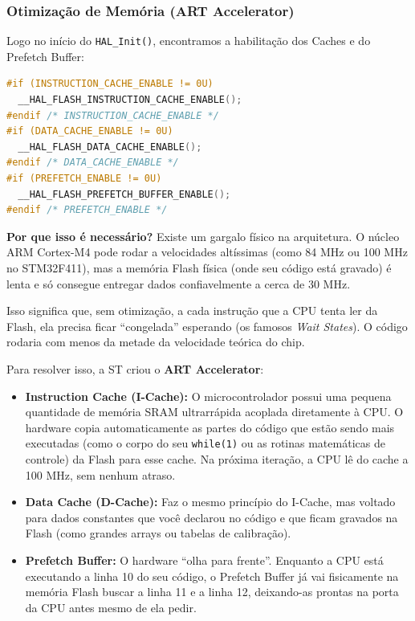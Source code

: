 \documentclass[12pt,a4paper]{article}
\begin{document}
\subsubsection{Otimização de Memória (ART Accelerator)}

Logo no início do \texttt{HAL\_Init()}, encontramos a habilitação dos Caches e do Prefetch Buffer:

\begin{lstlisting}[language=C]
#if (INSTRUCTION_CACHE_ENABLE != 0U)
  __HAL_FLASH_INSTRUCTION_CACHE_ENABLE();
#endif /* INSTRUCTION_CACHE_ENABLE */
#if (DATA_CACHE_ENABLE != 0U)
  __HAL_FLASH_DATA_CACHE_ENABLE();
#endif /* DATA_CACHE_ENABLE */
#if (PREFETCH_ENABLE != 0U)
  __HAL_FLASH_PREFETCH_BUFFER_ENABLE();
#endif /* PREFETCH_ENABLE */
\end{lstlisting}

\textbf{Por que isso é necessário?}
Existe um gargalo físico na arquitetura. O núcleo ARM Cortex-M4 pode rodar a velocidades altíssimas (como 84 MHz ou 100 MHz no STM32F411), mas a memória Flash física (onde seu código está gravado) é lenta e só consegue entregar dados confiavelmente a cerca de 30 MHz.

Isso significa que, sem otimização, a cada instrução que a CPU tenta ler da Flash, ela precisa ficar ``congelada'' esperando (os famosos \textit{Wait States}). O código rodaria com menos da metade da velocidade teórica do chip.

Para resolver isso, a ST criou o \textbf{ART Accelerator}:
\begin{itemize}
    \item \textbf{Instruction Cache (I-Cache):} O microcontrolador possui uma pequena quantidade de memória SRAM ultrarrápida acoplada diretamente à CPU. O hardware copia automaticamente as partes do código que estão sendo mais executadas (como o corpo do seu \texttt{while(1)} ou as rotinas matemáticas de controle) da Flash para esse cache. Na próxima iteração, a CPU lê do cache a 100 MHz, sem nenhum atraso.
    \item \textbf{Data Cache (D-Cache):} Faz o mesmo princípio do I-Cache, mas voltado para dados constantes que você declarou no código e que ficam gravados na Flash (como grandes arrays ou tabelas de calibração).
    \item \textbf{Prefetch Buffer:} O hardware ``olha para frente''. Enquanto a CPU está executando a linha 10 do seu código, o Prefetch Buffer já vai fisicamente na memória Flash buscar a linha 11 e a linha 12, deixando-as prontas na porta da CPU antes mesmo de ela pedir.
\end{itemize}
\end{document}
